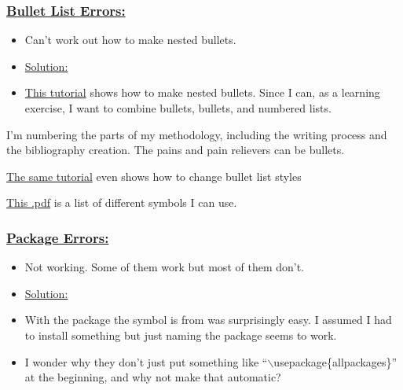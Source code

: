\documentclass[12pt]{article}
\begin{document}
\subsubsection{\underline{Bullet List Errors:}}\label{error:er2}
\begin{itemize}
    \item Can’t work out how to make nested bullets.
\end{itemize}
\begin{itemize}
\renewcommand{\labelitemi}{$\nobullet$}
\item \underline{Solution:}
\renewcommand{\labelitemi}{$\bullet$}
    \item \href{https://www.overleaf.com/learn/latex/Lists}{This tutorial} shows how to make nested bullets. Since I can, as a learning exercise, I want to combine bullets, bullets, and numbered lists.
\end{itemize}

I’m numbering the parts of my methodology, including the writing process and the bibliography creation. The pains and pain relievers can be bullets.

\href{https://www.overleaf.com/learn/latex/Lists}{The same tutorial} even shows how to change bullet list styles

\href{http://www.rpi.edu/dept/arc/training/latex/LaTeX_symbols.pdf}{This .pdf} is a list of different symbols I can use. 

\subsubsection{\underline{Package Errors:}}\label{error:er3}
\begin{itemize}
    \item Not working. Some of them work but most of them don’t.
\end{itemize}
\begin{itemize}
\renewcommand{\labelitemi}{$\nobullet$}
\item \underline{Solution:}
\renewcommand{\labelitemi}{$\bullet$}
    \item \usepackage{} With the package the symbol is from was surprisingly easy. I assumed I had to install something but just naming the package seems to work. 
    \item I wonder why they don’t just put something like “$\backslash$usepackage\{allpackages\}” at the beginning, and why not make that automatic?
\end{itemize}
    
\end{document}
